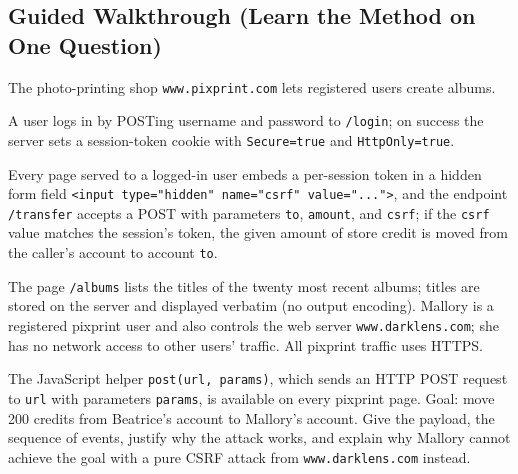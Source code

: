 \documentclass[12pt, a4paper]{article}
\begin{document}
\subsection*{Guided Walkthrough (Learn the Method on One Question)}

\begin{problembox}
The photo-printing shop \texttt{www.pixprint.com} lets registered users create albums.

A user logs in by POSTing username and password to \texttt{/login}; on success the server sets a session-token cookie with \texttt{Secure=true} and \texttt{HttpOnly=true}.

Every page served to a logged-in user embeds a per-session token in a hidden form field \texttt{<input type="hidden" name="csrf" value="...">}, and the endpoint \texttt{/transfer} accepts a POST with parameters \texttt{to}, \texttt{amount}, and \texttt{csrf}; if the \texttt{csrf} value matches the session's token, the given amount of store credit is moved from the caller's account to account \texttt{to}.

The page \texttt{/albums} lists the titles of the twenty most recent albums; titles are stored on the server and displayed verbatim (no output encoding). Mallory is a registered pixprint user and also controls the web server \texttt{www.darklens.com}; she has no network access to other users' traffic. All pixprint traffic uses HTTPS.

The JavaScript helper \texttt{post(url, params)}, which sends an HTTP POST request to \texttt{url} with parameters \texttt{params}, is available on every pixprint page.
Goal: move 200 credits from Beatrice's account to Mallory's account. Give the payload, the sequence of events, justify why the attack works, and explain why Mallory cannot achieve the goal with a pure CSRF attack from \texttt{www.darklens.com} instead.
\end{problembox}
\end{document}
